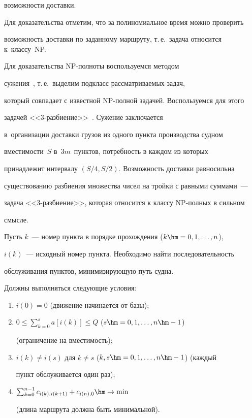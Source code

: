 возможности доставки.


  


  Для доказательства отметим, что за полиномиальное время можно проверить 


возможность доставки по заданному маршруту, т.\,е.\ задача относится к~классу~NP.


  


  Для доказательства NP-полноты воспользуемся методом 


сужения~\cite[с.~85]{12-br}, т.\,е.\ выделим подкласс рассматриваемых задач, 


который совпадает с известной NP-пол\-ной задачей. Воспользуемся для этого 


задачей <<3-раз\-би\-ение>>~\cite[с.~383]{12-br}. Сужение заключается 


в~организации доставки грузов из одного пункта производства судном 


вместимости~$S$ в~$3m$~пунктов, потребность в каждом из которых 


принадлежит интервалу $(S/4, S/2)$. Возможность доставки равносильна 


существованию разбиения множества чисел на тройки с равными суммами~--- 


задача <<3-раз\-би\-ение>>, которая относится к классу NP-пол\-ных в сильном 


смысле.


  


  Пусть $k$~--- номер пункта в порядке прохождения ($k\hm= 0, 1, \ldots, n$), 


$i(k)$~--- исходный номер пункта. Необходимо найти последовательность 


обслуживания пунктов, минимизирующую путь судна.


  


  Должны выполняться следующие условия:


  \begin{enumerate}[(1)]


\item $i(0)=0$ (движение начинается от базы);


\item $0\leq \sum\nolimits_{k=0}^s a[i(k)]\leq Q$ ($s \hm= 0, 1, \ldots, n\hm-1$) 


(ограничение на вместимость); 


\item $i(k)\not= i(s)$ для $k\not= s$ ($k, s \hm= 0, 1, \ldots , n\hm-1$) (каждый 


пункт обслуживается один раз);


\item $\sum\nolimits_{k=0}^{n-1} c_{i(k), i(k+1)}+c_{i(n),0}\hm\to \min$


(длина маршрута должна быть минимальной).


\end{enumerate}





